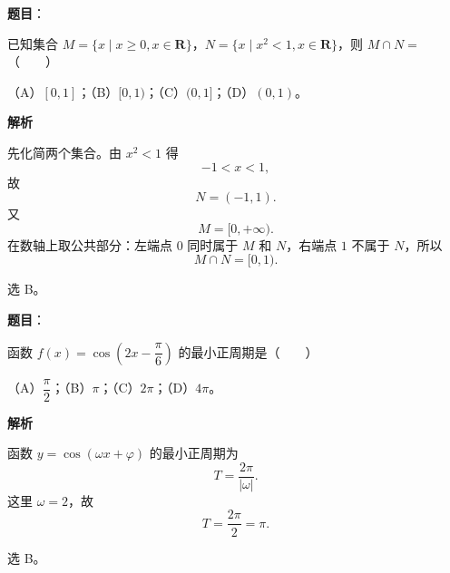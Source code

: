 

\begin{answer}

\textbf{题目}：

已知集合 $M=\{x\mid x\geqslant 0,x\in\mathbf R\}$，$N=\{x\mid x^2<1,x\in\mathbf R\}$，则 $M\cap N=$\mbox{（　　）}

（A）$[0,1]$；（B）$[0,1)$；（C）$(0,1]$；（D）$(0,1)$。

\textbf{解析}

先化简两个集合。由 $x^2<1$ 得
\nopagebreak[4]
\[-1<x<1,\]
故
\nopagebreak[4]
\[N=(-1,1).\]
又
\nopagebreak[4]
\[M=[0,+\infty).\]
在数轴上取公共部分：左端点 $0$ 同时属于 $M$ 和 $N$，右端点 $1$ 不属于 $N$，所以
\nopagebreak[4]
\[M\cap N=[0,1).\]

选 B。

\gkanswer{答案：B。$N=(-1,1)$，与 $M=[0,+\infty)$ 取交集得 $[0,1)$。}

\end{answer}
\begin{answer}

\textbf{题目}：

函数 $f(x)=\cos\left(2x-\dfrac\pi6\right)$ 的最小正周期是\mbox{（　　）}

（A）$\dfrac\pi2$；（B）$\pi$；（C）$2\pi$；（D）$4\pi$。

\textbf{解析}

函数 $y=\cos(\omega x+\varphi)$ 的最小正周期为
\nopagebreak[4]
\[T=\frac{2\pi}{|\omega|}.\]
这里 $\omega=2$，故
\nopagebreak[4]
\[T=\frac{2\pi}{2}=\pi.\]

选 B。


\end{answer}
